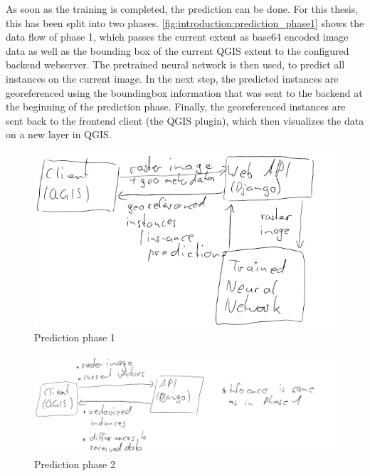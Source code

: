 As soon as the training is completed, the prediction can be done. For this thesis, this has been split into two phases. \autoref{fig:introduction:prediction_phase1} shows the data flow of phase 1, which passes the current extent as base64 encoded image data as well as the bounding box of the current QGIS extent to the configured backend webserver. The pretrained neural network is then used, to predict all instances on the current image. In the next step, the predicted instances are georeferenced using the boundingbox information that was sent to the backend at the beginning of the prediction phase. Finally, the georeferenced instances are sent back to the frontend client (the QGIS plugin), which then visualizes the data on a new layer in QGIS.

\begin{figure}[H]
    \centering
	\includegraphics[width=0.9\linewidth]{chapters/introduction/images/inference_phase1.png}
	\caption{Prediction phase 1}
	\label{fig:introduction:prediction_phase1}
\end{figure}

\begin{figure}[H]
    \centering
	\includegraphics[width=0.9\linewidth]{chapters/introduction/images/inference_phase2.png}
	\caption{Prediction phase 2}
	\label{fig:introduction:prediction_phase2}
\end{figure}



